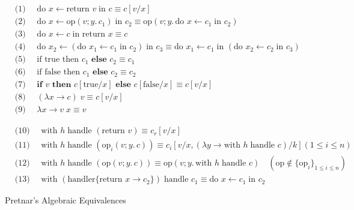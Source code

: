\documentclass[logo,bsc,singlespacing,parskip]{infthesis}
\begin{document}
\begin{figure}[H]
    \centering
    \begin{tcolorbox}[colframe=black, colback=white, sharp corners]
    \begin{align*}
        &\text{(1) } \quad \text{do } x \leftarrow \text{return } v \; \text{in } c \equiv c[v/x] \\
        &\text{(2) } \quad \text{do } x \leftarrow \text{op}(v; y.\, c_1) \; \text{in } c_2 \equiv \text{op}(v; y.\, \text{do } x \leftarrow c_1 \; \text{in } c_2) \\
        &\text{(3) } \quad \text{do } x \leftarrow c \; \text{in return } x \equiv c \\
        &\text{(4) } \quad \text{do } x_2 \leftarrow (\text{do } x_1 \leftarrow c_1 \; \text{in } c_2) \; \text{in } c_3 \equiv \text{do } x_1 \leftarrow c_1 \; \text{in } (\text{do } x_2 \leftarrow c_2 \; \text{in } c_3) \\
        &\text{(5) } \quad \text{if true then } c_1 \textbf{ else } c_2 \equiv c_1 \\
        &\text{(6) } \quad \text{if false then } c_1 \textbf{ else } c_2 \equiv c_2 \\
        &\text{(7) } \quad \textbf{if } v \textbf{ then } c[\text{true}/x] \textbf{ else } c[\text{false}/x] \equiv c[v/x] \\
        &\text{(8) } \quad (\lambda x \rightarrow c) \; v \equiv c[v/x] \\
        &\text{(9) } \quad \lambda x \rightarrow v \; x \equiv v 
    \end{align*}
    \end{tcolorbox}
    
    \begin{tcolorbox}[colframe=black, colback=white, sharp corners]
    \begin{align*}
        &\text{(10) } \quad \text{with } h \; \text{handle } (\text{return } v) \equiv c_r[v/x] \\
        &\text{(11) } \quad \text{with } h \; \text{handle } (\text{op}_i(v; y.\, c)) \equiv c_i[v/x, (\lambda y \rightarrow \text{with } h \; \text{handle } c)/k]  (1 \leq i \leq n) \\
        &\text{(12) } \quad \text{with } h \; \text{handle } (\text{op}(v; y.\, c)) \equiv \text{op}(v; y.\, \text{with } h \; \text{handle } c) \quad (\text{op} \notin \{\text{op}_i\}_{1 \leq i \leq n}) \\
        &\text{(13) } \quad \text{with } (\text{handler} \{\text{return } x \rightarrow c_2\}) \; \text{handle } c_1 \equiv \text{do } x \leftarrow c_1 \; \text{in } c_2
    \end{align*}
    \end{tcolorbox}

    \caption{Pretnar's Algebraic Equivalences}
    \label{fig:equational-laws}
\end{figure}
\end{document}
